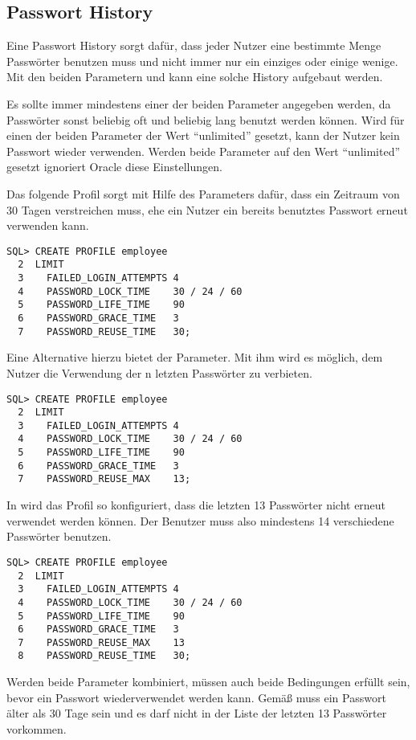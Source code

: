       \subsection{Passwort History}
        Eine Passwort History sorgt dafür, dass jeder Nutzer eine bestimmte
        Menge Passwörter benutzen muss und nicht immer nur ein einziges oder
        einige wenige. Mit den beiden Parametern
         und
         kann eine solche History aufgebaut
        werden.
        \begin{merke}
          Es sollte immer mindestens einer der beiden Parameter angegeben
          werden, da Passwörter sonst beliebig oft und beliebig lang benutzt
          werden können. Wird für einen der beiden Parameter der Wert
          \enquote{unlimited} gesetzt, kann der Nutzer kein Passwort wieder
          verwenden. Werden beide Parameter auf den Wert \enquote{unlimited}
          gesetzt ignoriert Oracle diese Einstellungen.
        \end{merke}
        Das folgende Profil sorgt mit Hilfe des Parameters  dafür, dass ein Zeitraum von 30 Tagen verstreichen muss, ehe ein Nutzer ein bereits benutztes Passwort erneut verwenden kann.
        \begin{lstlisting}[caption={Wiederverwendung eines
        Passworts},label=admin221,language=oracle_sql]
SQL> CREATE PROFILE employee
  2  LIMIT
  3    FAILED_LOGIN_ATTEMPTS 4
  4    PASSWORD_LOCK_TIME    30 / 24 / 60
  5    PASSWORD_LIFE_TIME    90
  6    PASSWORD_GRACE_TIME   3
  7    PASSWORD_REUSE_TIME   30;
        \end{lstlisting}
        Eine Alternative hierzu bietet der  Parameter. Mit ihm wird es möglich, dem Nutzer die Verwendung der n letzten Passwörter zu verbieten.
        \begin{lstlisting}[caption={Wiederverwendung eines
        Passworts},label=admin222,language=oracle_sql]
SQL> CREATE PROFILE employee
  2  LIMIT
  3    FAILED_LOGIN_ATTEMPTS 4
  4    PASSWORD_LOCK_TIME    30 / 24 / 60
  5    PASSWORD_LIFE_TIME    90
  6    PASSWORD_GRACE_TIME   3
  7    PASSWORD_REUSE_MAX    13;
        \end{lstlisting}
        In  wird das Profil so konfiguriert, dass die letzten 13 Passwörter nicht erneut verwendet werden können. Der Benutzer muss also mindestens 14 verschiedene Passwörter benutzen.
        \begin{lstlisting}[caption={Wiederverwendung eines
        Passworts},label=admin223,language=oracle_sql]
SQL> CREATE PROFILE employee
  2  LIMIT
  3    FAILED_LOGIN_ATTEMPTS 4
  4    PASSWORD_LOCK_TIME    30 / 24 / 60
  5    PASSWORD_LIFE_TIME    90
  6    PASSWORD_GRACE_TIME   3
  7    PASSWORD_REUSE_MAX    13
  8    PASSWORD_REUSE_TIME   30;
        \end{lstlisting}
        Werden beide Parameter kombiniert, müssen auch beide Bedingungen erfüllt sein, bevor ein Passwort wiederverwendet werden kann. Gemäß  muss ein Passwort älter als 30 Tage sein und es darf nicht in der Liste der letzten 13 Passwörter vorkommen.
